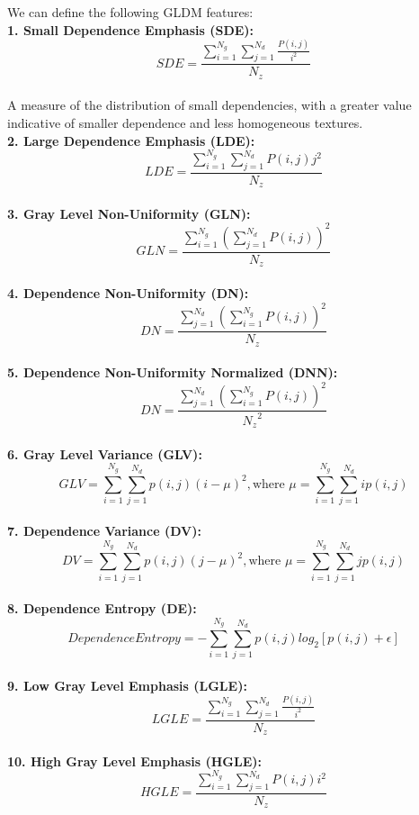 We can define the following GLDM features:\\
\textbf{1. Small Dependence Emphasis (SDE):}\\
\[SDE=\frac{\sum _{i=1}^{N_{g}}\sum _{j=1}^{N_{d}}\frac{P\left(i,j\right)}{i^{2}}}{N_{z}}\]\\
A measure of the distribution of small dependencies, with a greater value indicative of smaller dependence and less homogeneous textures.\\
\textbf{2. Large Dependence Emphasis (LDE):}\\
\[LDE=\frac{\sum _{i=1}^{N_{g}}\sum _{j=1}^{N_{d}}P\left(i,j\right)j^{2}}{N_{z}}\]\\
\textbf{3. Gray Level Non-Uniformity (GLN):}\\
\[GLN=\frac{\sum _{i=1}^{N_{g}}\left(\sum _{j=1}^{N_{d}}P\left(i,j\right)\right)^{2}}{N_{z}}\]\\
\textbf{4. Dependence Non-Uniformity (DN):}\\
\[DN=\frac{\sum _{j=1}^{N_{d}}\left(\sum _{i=1}^{N_{g}}P\left(i,j\right)\right)^{2}}{N_{z}}\]\\
\textbf{5. Dependence Non-Uniformity Normalized (DNN):}\\
\[DN=\frac{\sum _{j=1}^{N_{d}}\left(\sum _{i=1}^{N_{g}}P\left(i,j\right)\right)^{2}}{{N_{z}}^{2}}\]\\
\textbf{6. Gray Level Variance (GLV):}\\
\[GLV=\sum _{i=1}^{N_{g}}\sum _{j=1}^{N_{d}}p\left(i,j\right)\left(i-\mu \right)^{2},\text{where } \mu =\sum _{i=1}^{N_{g}}\sum _{j=1}^{N_{d}}ip\left(i,j\right)\]\\
\textbf{7. Dependence Variance (DV):}\\
\[DV=\sum _{i=1}^{N_{g}}\sum _{j=1}^{N_{d}}p\left(i,j\right)\left(j-\mu \right)^{2},\text{where } \mu =\sum _{i=1}^{N_{g}}\sum _{j=1}^{N_{d}}jp\left(i,j\right)\]\\
\textbf{8. Dependence Entropy (DE):}\\
\[\textit{DependenceEntropy}=-\sum _{i=1}^{N_{g}}\sum _{j=1}^{N_{d}}p\left(i,j\right)log_{2}\left[p\left(i,j\right)+\epsilon \right]\]\\
\textbf{9. Low Gray Level Emphasis (LGLE):}\\
\[LGLE=\frac{\sum _{i=1}^{N_{g}}\sum _{j=1}^{N_{d}}\frac{P\left(i,j\right)}{i^{2}}}{N_{z}}\]\\
\textbf{10. High Gray Level Emphasis (HGLE):}\\
\[HGLE=\frac{\sum _{i=1}^{N_{g}}\sum _{j=1}^{N_{d}}P\left(i,j\right)i^{2}}{N_{z}}\]\\

